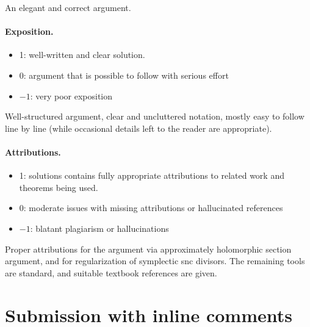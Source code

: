 \documentclass[11pt]{article}
\theoremstyle{definition}
\theoremstyle{remark}
\begin{document}
\vspace{5mm}
  An elegant and correct argument. 


\paragraph{Exposition.}
\begin{itemize}
	\item  1: well-written and clear solution.
	\item  0: argument that is possible to follow with serious effort
	\item  $-1$: very poor exposition
\end{itemize}

 Well-structured argument, clear and uncluttered notation, mostly easy to follow line by line (while occasional details left to the reader are appropriate).

\paragraph{Attributions.}
\begin{itemize}
	\item  1: solutions contains fully appropriate attributions
		to related work and theorems being used.
	\item  0: moderate issues with missing attributions or hallucinated references
	\item  $-1$: blatant plagiarism or hallucinations
\end{itemize}

 Proper attributions for the argument via approximately holomorphic section argument, and for regularization of symplectic snc divisors. The remaining tools are standard, and suitable textbook references are given.

\newpage
\section{Submission with inline comments}


\begin{abstract}
The answer is affirmative, with the cohomologous deformation allowed in
the question.  The proof first enlarges the divisor by auxiliary
symplectic hypersurfaces so that their cohomology classes satisfy a
redundancy condition.  An integral matrix of relations among these
classes then produces globally defined, smooth, nonvanishing functions
on the divisor complement.  Locally, suitable roots of monomials in
these functions are defining coordinates.  A convexity argument for
tame almost complex structures makes the required functions
holomorphic simultaneously.
\end{abstract}
\end{document}
